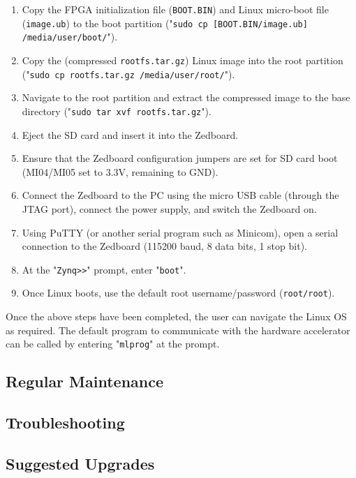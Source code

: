 \documentclass[10pt,letterpaper]{article}
\begin{document}
\begin{enumerate}
\item Copy the FPGA initialization file (\texttt{BOOT.BIN}) and Linux micro-boot file (\texttt{image.ub}) to the boot partition ("\texttt{sudo cp [BOOT.BIN/image.ub] /media/user/boot/}").
\item Copy the (compressed \texttt{rootfs.tar.gz}) Linux image into the root partition ("\texttt{sudo cp rootfs.tar.gz /media/user/root/}"). 
\item Navigate to the root partition and extract the compressed image to the base directory ("\texttt{sudo tar xvf rootfs.tar.gz}").
\item Eject the SD card and insert it into the Zedboard.
\item Ensure that the Zedboard configuration jumpers are set for SD card boot (MI04/MI05 set to 3.3V, remaining to GND).
\item Connect the Zedboard to the PC using the micro USB cable (through the JTAG port), connect the power supply, and switch the Zedboard on.
\item Using PuTTY (or another serial program such as Minicom), open a serial connection to the Zedboard (115200 baud, 8 data bits, 1 stop bit).
\item At the "\texttt{Zynq>>}" prompt, enter "\texttt{boot}".
\item Once Linux boots, use the default root username/password (\texttt{root/root}).
\end{enumerate}

Once the above steps have been completed, the user can navigate the Linux OS as required. The default program to communicate with the hardware accelerator can be called by entering "\texttt{mlprog}" at the prompt.

\subsection{Regular Maintenance}
\subsection{Troubleshooting}
\subsection{Suggested Upgrades}
\clearpage
{}



\end{document}
